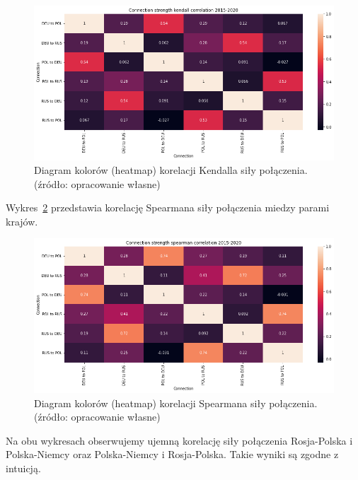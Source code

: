 \documentclass[11pt]{report}
\begin{document}
    \begin{figure}[!ht]
        \centering
        \includegraphics[width=\linewidth]{../spade_proto/figures/correlation/Connection strength kendall correlation 2015-2020.png}
        \caption{Diagram kolorów (heatmap) korelacji Kendalla siły połączenia. (źródło: opracowanie własne)}
        \label{fig:Connection strength kendall correlation 2015-2020}
    \end{figure}

    Wykres~\ref{fig:Connection strength spearman correlation 2015-2020} przedstawia korelację Spearmana siły połączenia miedzy parami krajów.

    \begin{figure}[!ht]
        \centering
        \includegraphics[width=\linewidth]{../spade_proto/figures/correlation/Connection strength spearman correlation 2015-2020.png}
        \caption{Diagram kolorów (heatmap) korelacji Spearmana siły połączenia. (źródło: opracowanie własne)}
        \label{fig:Connection strength spearman correlation 2015-2020}
    \end{figure}

    Na obu wykresach obserwujemy ujemną korelację siły połączenia Rosja-Polska i Polska-Niemcy oraz Polska-Niemcy i Rosja-Polska.
    Takie wyniki są zgodne z intuicją.
\end{document}

